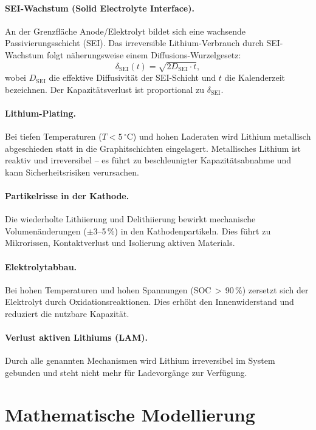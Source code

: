 ﻿\documentclass[a4paper,12pt]{article}
\theoremstyle{definition}
\begin{document}
\paragraph{SEI-Wachstum (Solid Electrolyte Interface).}
An der Grenzfl\"ache Anode/Elektrolyt bildet sich eine wachsende
Passivierungsschicht (SEI). Das irreversible Lithium-Verbrauch durch
SEI-Wachstum folgt n\"aherungsweise einem Diffusions-Wurzelgesetz:
\[
  \delta_{\mathrm{SEI}}(t) = \sqrt{2 D_{\mathrm{SEI}} \cdot t},
\]
wobei $D_{\mathrm{SEI}}$ die effektive Diffusivit\"at der SEI-Schicht und $t$
die Kalenderzeit bezeichnen. Der Kapazit\"atsverlust ist proportional zu
$\delta_{\mathrm{SEI}}$.

\paragraph{Lithium-Plating.}
Bei tiefen Temperaturen ($T < 5\,^{\circ}\mathrm{C}$) und hohen Laderaten wird Lithium
metallisch abgeschieden statt in die Graphitschichten eingelagert.
Metallisches Lithium ist reaktiv und irreversibel -- es f\"uhrt zu
beschleunigter Kapazit\"atsabnahme und kann Sicherheitsrisiken verursachen.

\paragraph{Partikelrisse in der Kathode.}
Die wiederholte Lithiierung und Delithiierung bewirkt mechanische
Volumen\"anderungen ($\pm$3--5\,\%) in den Kathodenpartikeln.
Dies f\"uhrt zu Mikrorissen, Kontaktverlust und Isolierung aktiven Materials.

\paragraph{Elektrolytabbau.}
Bei hohen Temperaturen und hohen Spannungen (SOC\,$>$\,90\,\%) zersetzt
sich der Elektrolyt durch Oxidationsreaktionen. Dies erh\"oht den Innenwiderstand
und reduziert die nutzbare Kapazit\"at.

\paragraph{Verlust aktiven Lithiums (LAM).}
Durch alle genannten Mechanismen wird Lithium irreversibel im System gebunden
und steht nicht mehr f\"ur Ladevorg\"ange zur Verf\"ugung.

\section{Mathematische Modellierung}
\end{document}
